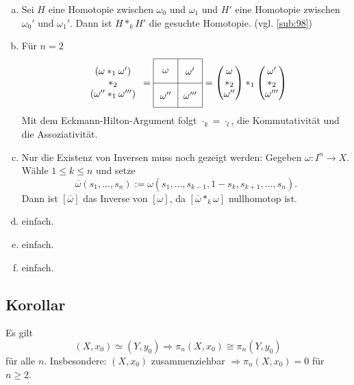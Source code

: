 \begin{enumerate}[a)]
	\item Sei $H$ eine Homotopie zwischen $\omega_0$ und $\omega_1$ und $H'$ eine Homotopie zwischen $\omega_0'$ und $\omega_1'$. Dann ist $H *_k H'$ die gesuchte 
	Homotopie. \hfill (vgl. \ref{sub:98})
	\item Für $n=2$
	\[
		\begin{array}{c}
			(\omega *_1 \omega') \\
			*_2 \\
			(\omega'' *_1 \omega''')
			
		\end{array}
		 = 
		\vcenter{\hbox{\begin{tikzpicture}[scale=0.9]
			\draw (0,0) grid (2,2);
			\node at (0.5,0.5){$\omega''$};
			\node at (0.5,1.5){$\omega$};
			\node at (1.5,0.5){$\omega'''$};
			\node at (1.5,1.5){$\omega'$};
		\end{tikzpicture}}}
		 = \begin{pmatrix}
		 	\omega \\
			*_2 \\
			\omega''
		 \end{pmatrix} *_1
		 \begin{pmatrix}
		 	\omega' \\
			*_2 \\
			\omega'''
		 \end{pmatrix}
	\]
	Mit dem Eckmann-Hilton-Argument folgt $\cdot_k = \cdot_l$, die Kommutativität und die Assoziativität.
	\item Nur die Existenz von Inversen muss noch gezeigt werden:
	Gegeben $\omega : I^n \to X$. Wähle $1 \le k \le n$ und setze
	\[
		\overline{\omega} (s_1, \ldots , s_n) := \omega (s_1, \ldots , s_{k-1} ,1- s_k , s_{k+1}, \ldots , s_n). 
	\]
	Dann ist $[\overline{\omega}]$ das Inverse von $[\omega]$, da $[\overline{\omega} *_k \omega ]$ nullhomotop ist.
	\item einfach.
	\item einfach.
	\item einfach. \bewende
\end{enumerate}

\subsection[Korollar: Die Homotopiegruppen punktiert homöomorpher Räume stimmen überein]{Korollar} %
\label{sub:147}
Es gilt 
\[
	(X,x_0) \simeq (Y,y_0) \Longrightarrow \pi_n(X,x_0) \cong \pi_n(Y,y_0)
\]
für alle $n$. Insbesondere: $(X,x_0)$ zusammenziehbar $\Rightarrow \pi_n(X,x_0) = 0$ für $n \ge 2$.

